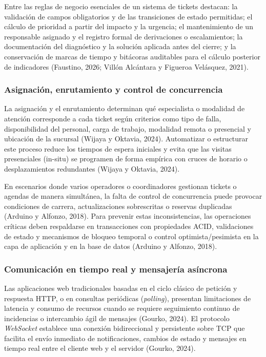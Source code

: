 Entre las reglas de negocio esenciales de un sistema de tickets destacan: la validación de campos obligatorios y de las transiciones de estado permitidas; el cálculo de prioridad a partir del impacto y la urgencia; el mantenimiento de un responsable asignado y el registro formal de derivaciones o escalamientos; la documentación del diagnóstico y la solución aplicada antes del cierre; y la conservación de marcas de tiempo y bitácoras auditables para el cálculo posterior de indicadores (Faustino, 2026; Villón Alcántara y Figueroa Velásquez, 2021).

\subsubsection{Asignación, enrutamiento y control de concurrencia}
La asignación y el enrutamiento determinan qué especialista o modalidad de atención corresponde a cada ticket según criterios como tipo de falla, disponibilidad del personal, carga de trabajo, modalidad remota o presencial y ubicación de la sucursal (Wijaya y Oktavia, 2024). Automatizar o estructurar este proceso reduce los tiempos de espera iniciales y evita que las visitas presenciales (in-situ) se programen de forma empírica con cruces de horario o desplazamientos redundantes (Wijaya y Oktavia, 2024).

En escenarios donde varios operadores o coordinadores gestionan tickets o agendas de manera simultánea, la falta de control de concurrencia puede provocar condiciones de carrera, actualizaciones sobrescritas o reservas duplicadas (Arduino y Alfonzo, 2018). Para prevenir estas inconsistencias, las operaciones críticas deben respaldarse en transacciones con propiedades ACID, validaciones de estado y mecanismos de bloqueo temporal o control optimista/pesimista en la capa de aplicación y en la base de datos (Arduino y Alfonzo, 2018).

\subsubsection{Comunicación en tiempo real y mensajería asíncrona}
Las aplicaciones web tradicionales basadas en el ciclo clásico de petición y respuesta HTTP, o en consultas periódicas (\textit{polling}), presentan limitaciones de latencia y consumo de recursos cuando se requiere seguimiento continuo de incidencias o intercambio ágil de mensajes (Gourko, 2024). El protocolo \textit{WebSocket} establece una conexión bidireccional y persistente sobre TCP que facilita el envío inmediato de notificaciones, cambios de estado y mensajes en tiempo real entre el cliente web y el servidor (Gourko, 2024).

